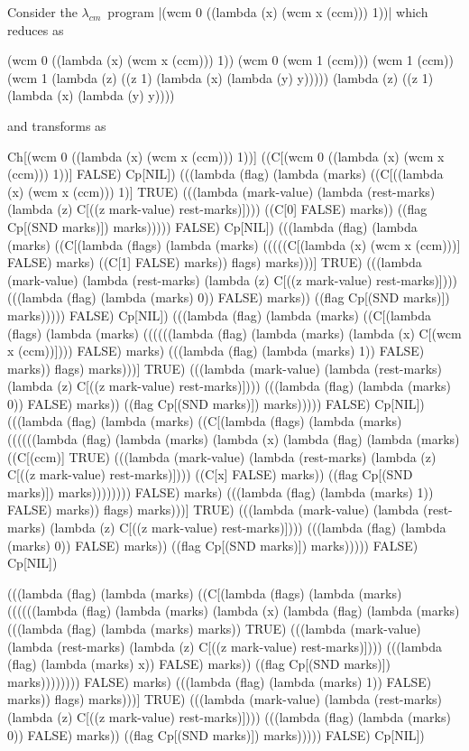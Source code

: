 \documentclass{llncs}
\newcommand{\cm}[0]{$\lambda_{cm}$}
\begin{document}
Consider the \cm\ program \scheme|(wcm 0 ((lambda (x) (wcm x (ccm))) 1))| which reduces as
\begin{schemedisplay}
(wcm 0 ((lambda (x) (wcm x (ccm))) 1))
(wcm 0 (wcm 1 (ccm)))
(wcm 1 (ccm))
(wcm 1 (lambda (z) ((z 1) (lambda (x) (lambda (y) y)))))
(lambda (z) ((z 1) (lambda (x) (lambda (y) y))))
\end{schemedisplay}
and transforms as
\begin{schemedisplay}
Ch[(wcm 0 ((lambda (x) (wcm x (ccm))) 1))]
((C[(wcm 0 ((lambda (x) (wcm x (ccm))) 1))] FALSE) Cp[NIL])
(((lambda (flag)
  (lambda (marks)
    ((C[((lambda (x) (wcm x (ccm))) 1)] TRUE)
     (((lambda (mark-value) (lambda (rest-marks) (lambda (z) C[((z mark-value) rest-marks)])))
       ((C[0] FALSE) marks))
      ((flag Cp[(SND marks)]) marks)))))
 FALSE)
Cp[NIL])
(((lambda (flag)
  (lambda (marks)
    ((C[(lambda (flags)
  (lambda (marks)
    (((((C[(lambda (x) (wcm x (ccm)))] FALSE) marks)
       ((C[1] FALSE) marks))
      flags)
     marks)))] TRUE)
     (((lambda (mark-value) (lambda (rest-marks) (lambda (z) C[((z mark-value) rest-marks)])))
       (((lambda (flag) (lambda (marks) 0)) FALSE) marks))
      ((flag Cp[(SND marks)]) marks)))))
 FALSE)
Cp[NIL])
(((lambda (flag)
  (lambda (marks)
    ((C[(lambda (flags)
  (lambda (marks)
    ((((((lambda (flag)
           (lambda (marks)
             (lambda (x)
               C[(wcm x (ccm))]))) FALSE) marks)
       (((lambda (flag) (lambda (marks) 1)) FALSE) marks))
      flags)
     marks)))] TRUE)
     (((lambda (mark-value) (lambda (rest-marks) (lambda (z) C[((z mark-value) rest-marks)])))
       (((lambda (flag) (lambda (marks) 0)) FALSE) marks))
      ((flag Cp[(SND marks)]) marks)))))
 FALSE)
Cp[NIL])
(((lambda (flag)
  (lambda (marks)
    ((C[(lambda (flags)
  (lambda (marks)
    ((((((lambda (flag)
           (lambda (marks)
             (lambda (x)
               (lambda (flag)
  (lambda (marks)
    ((C[(ccm)] TRUE)
     (((lambda (mark-value) (lambda (rest-marks) (lambda (z) C[((z mark-value) rest-marks)])))
       ((C[x] FALSE) marks))
      ((flag Cp[(SND marks)]) marks)))))))) FALSE) marks)
       (((lambda (flag) (lambda (marks) 1)) FALSE) marks))
      flags)
     marks)))] TRUE)
     (((lambda (mark-value) (lambda (rest-marks) (lambda (z) C[((z mark-value) rest-marks)])))
       (((lambda (flag) (lambda (marks) 0)) FALSE) marks))
      ((flag Cp[(SND marks)]) marks)))))
 FALSE)
Cp[NIL])

(((lambda (flag)
  (lambda (marks)
    ((C[(lambda (flags)
  (lambda (marks)
    ((((((lambda (flag)
           (lambda (marks)
             (lambda (x)
               (lambda (flag)
  (lambda (marks)
    (((lambda (flag) (lambda (marks) marks)) TRUE)
     (((lambda (mark-value) (lambda (rest-marks) (lambda (z) C[((z mark-value) rest-marks)])))
       (((lambda (flag) (lambda (marks) x)) FALSE) marks))
      ((flag Cp[(SND marks)]) marks)))))))) FALSE) marks)
       (((lambda (flag) (lambda (marks) 1)) FALSE) marks))
      flags)
     marks)))] TRUE)
     (((lambda (mark-value) (lambda (rest-marks) (lambda (z) C[((z mark-value) rest-marks)])))
       (((lambda (flag) (lambda (marks) 0)) FALSE) marks))
      ((flag Cp[(SND marks)]) marks)))))
 FALSE)
Cp[NIL])
\end{schemedisplay}
\end{document}
